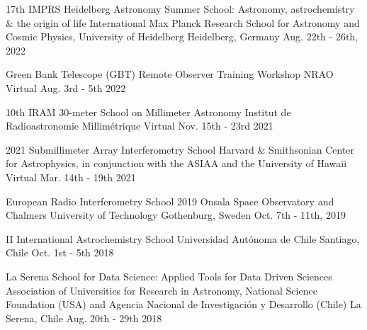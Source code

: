 

\begin{cvhonors}
	\cvhonor
	{17th IMPRS Heidelberg Astronomy Summer School: Astronomy, astrochemistry \& the origin of life} %
	{International Max Planck Research School for Astronomy and Cosmic Physics, University of Heidelberg}
	{Heidelberg, Germany} %
	{Aug. 22th - 26th, 2022} %
	
	\cvhonor
	{Green Bank Telescope (GBT) Remote Observer Training Workshop} %
	{NRAO} 
	{Virtual} %
	{Aug. 3rd - 5th 2022} %
	
	\cvhonor
	{10th IRAM 30-meter School on Millimeter Astronomy} %
	{Institut de Radioastronomie Millim\'etrique}
	{Virtual} %
	{Nov. 15th - 23rd 2021} %
	
	\cvhonor
	{2021 Submillimeter Array Interferometry School} %
	{Harvard \& Smithsonian Center for Astrophysics, in conjunction with the ASIAA and the University of Hawaii} 
	{Virtual}%
	{Mar. 14th - 19th 2021} %
	
	\cvhonor
	{European Radio Interferometry School 2019} %
	{Onsala Space Observatory and Chalmers University of Technology}%
	{Gothenburg, Sweden} %
	{Oct. 7th - 11th, 2019} %
	
	\cvhonor
	{II International Astrochemistry School} %
	{Universidad Aut\'onoma de Chile} 
	{Santiago, Chile}%
	{Oct. 1st - 5th 2018} %
	
	\cvhonor
	{La Serena School for Data Science: Applied Tools for Data Driven Sciences} %
	{Association of Universities for Research in Astronomy, National Science Foundation (USA) and Agencia Nacional de Investigaci\'on y Desarrollo (Chile)} {La Serena, Chile}%
	{Aug. 20th - 29th 2018} %
	

\end{cvhonors}